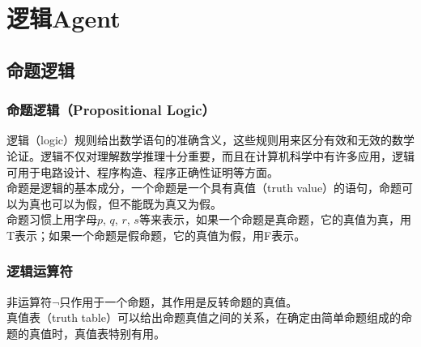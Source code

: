 \chapter{逻辑Agent}

\section{命题逻辑}

\subsection{命题逻辑（Propositional Logic）}

逻辑（logic）规则给出数学语句的准确含义，这些规则用来区分有效和无效的数学论证。逻辑不仅对理解数学推理十分重要，而且在计算机科学中有许多应用，逻辑可用于电路设计、程序构造、程序正确性证明等方面。\\

命题是逻辑的基本成分，一个命题是一个具有真值（truth value）的语句，命题可以为真也可以为假，但不能既为真又为假。\\

命题习惯上用字母$ p $, $ q $, $ r $, $ s $等来表示，如果一个命题是真命题，它的真值为真，用T表示；如果一个命题是假命题，它的真值为假，用F表示。\\

\subsection{逻辑运算符}

非运算符$ \neg $只作用于一个命题，其作用是反转命题的真值。\\

真值表（truth table）可以给出命题真值之间的关系，在确定由简单命题组成的命题的真值时，真值表特别有用。

\begin{table}[H]
    \centering
    \caption{NOT真值表}
\end{table}

